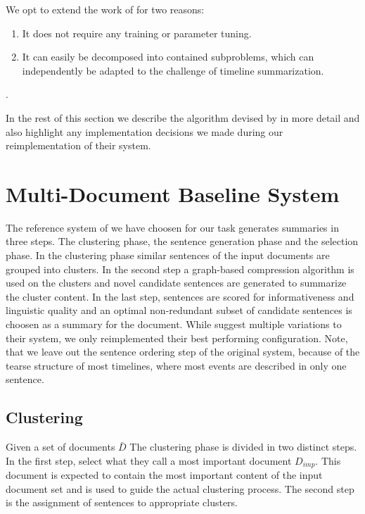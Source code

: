 \documentclass[a4paper,BCOR=10mm]{report}
\numberwithin{lemma}{chapter}
\numberwithin{definition}{chapter}
\begin{document}
We opt to extend the work of \citep{banerjee} for two reasons:

\begin{enumerate}
\item{It does not require any training or parameter tuning.}
\item{It can easily be decomposed into contained subproblems, which can independently be adapted to the challenge of timeline summarization.}
\end{enumerate}.

In the rest of this section we describe the algorithm devised by \citet{banerjee} in more detail and also highlight any implementation decisions we made during our reimplementation of their system.

\section{Multi-Document Baseline System} \label{sec:mds-baseline}

The reference system of \citet{banerjee} we have choosen for our task generates summaries in three steps. The clustering phase, the sentence generation phase and the selection phase. In the clustering phase similar sentences of the input documents are grouped into clusters. In the second step a graph-based compression algorithm is used on the clusters and novel candidate sentences are generated to summarize the cluster content. In the last step, sentences are scored for informativeness and linguistic quality and an optimal non-redundant subset of candidate sentences is choosen as a summary for the document.
While \citeauthor{banerjee} suggest multiple variations to their system, we only reimplemented their best performing configuration. Note, that we leave out the sentence ordering step of the original system, because of the tearse structure of most timelines, where most events are described in only one sentence.

\subsection{Clustering}  \label{sec:baseline-clustering}

Given a set of documents $\bar{D}$ The clustering phase is divided in two distinct steps. In the first step, \citeauthor{banerjee} select what they call a most important document $D_{imp}$. This document is expected to contain the most important content of the input document set and is used to guide the actual clustering process. The second step is the assignment of sentences to appropriate clusters.
\end{document}
